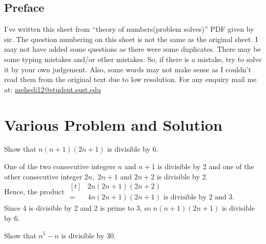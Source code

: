 \documentclass[12pt]{book}
\begin{document}
\section*{Preface}
I've written this sheet from ``theory of numbers(problem solves)'' PDF given by sir. The question numbering on this sheet is not the same as the original sheet. I may not have added some questions as there were some duplicates. There may be some typing mistakes and/or other mistakes. So, if there is a mistake, try to solve it by your own judgement. Also, some words may not make sense as I couldn't read them from the original text due to low resolution. For any enquiry mail me at: \href{mailto:mehedi12@student.sust.edu}{mehedi12@student.sust.edu}
\chapter*{Various Problem and Solution}
\begin{qn}
    Show that $ n (n+1)(2n+1) $ is divisible by $ 6 $.
\end{qn}
\begin{soln}
    One of the two consecutive integers $ n $ and $ n+1 $ is divisible by 2 and one of the other consecutive integer $ 2n,\;2n+1 $ and $ 2n+2 $ is divisible by 2.\\
    Hence, the product $ \begin{aligned}[t]
                & 2n(2n+1)(2n+2)                                  \\
            =\; & 4n(2n+1)(2n+1) \text{ is divisible by 2 and 3.}
        \end{aligned} $ \\
    Since 4 is divisible by 2 and 2 is prime to 3, so $ n (n+1)(2n+1) $ is divisible by $ 6 $.
\end{soln}
\begin{qn}
    Show that $ n^5-n $ is divisible by $ 30 $.
\end{qn}
\end{document}
